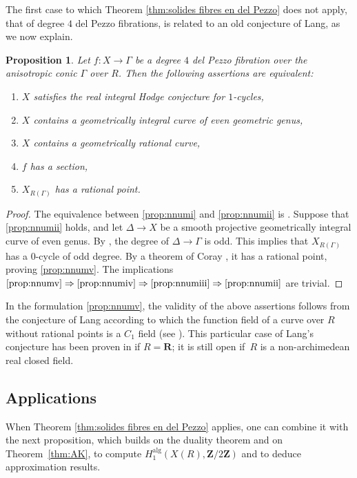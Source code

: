 \documentclass[JEP,XML,SOM,Unicode]{cedram}
\newcommand\implique{\mathchoice{\implies}{\Rightarrow}{\Rightarrow}{\Rightarrow}}
\theoremstyle{plain}
\newtheorem{prop}[thm]{Proposition}
\theoremstyle{definition}
\numberwithin{equation}{section}
\newcommand{\alg}{{\mathrm{alg}}}
\newcommand{\R}{{\mathbf R}}
\newcommand{\Z}{{\mathbf Z}}
\begin{document}
The first case to which Theorem \ref{thm:solides fibres en del Pezzo} does not apply, that of degree $4$ del Pezzo fibrations, is related to an old conjecture of Lang, as we now explain.

\begin{prop}\label{prop:nnum}
Let $f:X\to \Gamma$ be a degree $4$ del Pezzo fibration over the anisotropic conic $\Gamma$ over $R$.
Then the following assertions are equivalent:
\begin{enumerate}
\item\label{prop:nnumi} $X$ satisfies the real integral Hodge conjecture for $1$-cycles,
\item\label{prop:nnumii} $X$ contains a geometrically integral curve of even geometric genus,
\item\label{prop:nnumiii} $X$ contains a geometrically rational curve,
\item\label{prop:nnumiv} $f$ has a section,
\item\label{prop:nnumv} $X_{R(\Gamma)}$ has a rational point.
\end{enumerate}
\end{prop}

\begin{proof}
The equivalence between \eqref{prop:nnumi} and \eqref{prop:nnumii} is \cite[Cor.\,\ref*{BW1-cor:IHC pour solides RC ou CY}]{BW1}.
Suppose that \eqref{prop:nnumii} holds, and let $\Delta\to X$ be a smooth projective geometrically integral curve of even genus.
By \cite[Prop.\,\ref*{BW1-prop:genusundermorphism}]{BW1}, the degree of $\Delta\to\Gamma$ is odd.
This implies that $X_{R(\Gamma)}$ has a $0$-cycle of odd degree. By a theorem of Coray \cite{coray}, it has a rational point, proving \eqref{prop:nnumv}. The implications $\eqref{prop:nnumv}\implique\eqref{prop:nnumiv}\implique\eqref{prop:nnumiii}\implique\eqref{prop:nnumii}$ are trivial.
\end{proof}

In the formulation \eqref{prop:nnumv}, the validity of the above assertions follows from the conjecture
of Lang \cite[p.~379]{langrealplaces} according to which the function field of a curve over $R$ without rational points is a $C_1$ field (see \cite[Th.\,1 \& Th.\,3]{langquasialg}).
This particular case of Lang's conjecture has been proven in \cite[Th.\,0.13]{pi} if $R=\R$; it is still open if~$R$ is a non-archimedean real closed field.

\subsection{Applications}
When Theorem \ref{thm:solides fibres en del Pezzo} applies,
one can combine it with the next proposition,
which builds on the duality theorem \cite[Th.\,\ref*{BW1-th:image psi}]{BW1}
and on Theorem~\ref{thm:AK},
to compute $H_1^{\alg}(X(R),\Z/2\Z)$ and to deduce approximation results.
\end{document}
